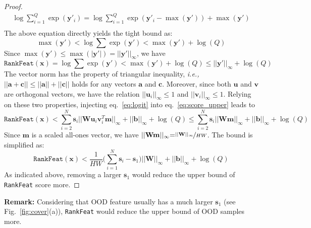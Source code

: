 \begin{proof}
\begin{equation}
\begin{gathered}
     \log \sum_{i=1}^{Q} \exp(\mathbf{y}'_{i}) =  \log \sum_{i=1}^{Q} \exp(\mathbf{y}'_{i}-\max(\mathbf{y}')) + \max(\mathbf{y}')\\
\end{gathered}
\end{equation}
The above equation directly yields the tight bound as:
\begin{equation}
    \max(\mathbf{y}')   < \log \sum \exp(\mathbf{y}') < \max(\mathbf{y}') + \log(Q)
\end{equation}
Since $\max(\mathbf{y}'){\leq}\max(|\mathbf{y}'|){=}||\mathbf{y}'||_{\infty}$, we have
\begin{equation}
    \texttt{RankFeat}(\mathbf{x}) = \log \sum \exp(\mathbf{y}') < \max(\mathbf{y}') + \log(Q) \leq  ||\mathbf{y}'||_{\infty} + \log(Q) 
    \label{eq:score_upper}
\end{equation}
The vector norm has the property of triangular inequality, \emph{i.e.,} $||\mathbf{a}+\mathbf{c}||\leq||\mathbf{a}||+||\mathbf{c}||$ holds for any vectors $\mathbf{a}$ and $\mathbf{c}$. Moreover, since both $\mathbf{u}$ and $\mathbf{v}$ are orthogonal vectors, we have the relation $||\mathbf{u}_{i}||_{\infty}{\leq}1$ and $||\mathbf{v}_{i}||_{\infty}{\leq}1$.
Relying on these two properties, injecting eq.~\eqref{eq:logit} into eq.~\eqref{eq:score_upper} leads to
\begin{equation}
    \texttt{RankFeat}(\mathbf{x}) {<} \sum_{i=2}^{N} \mathbf{s}_{i} ||\mathbf{W}\mathbf{u}_{i}\mathbf{v}_{i}^{T}\mathbf{m}||_{\infty} {+} ||\mathbf{b}||_{\infty} {+} \log(Q) {\leq} \sum_{i=2}^{N} \mathbf{s}_{i} ||\mathbf{W}\mathbf{m}||_{\infty} {+}  ||\mathbf{b}||_{\infty} {+} \log(Q)
\end{equation}
Since $\mathbf{m}$ is a scaled all-ones vector, we have $||\mathbf{W}\mathbf{m}||_{\infty}{=}\nicefrac{||\mathbf{W}||_{\infty}}{HW}$. The bound is simplified as:
\begin{equation}
    \texttt{RankFeat}(\mathbf{x}) <\frac{1}{HW} \Big(\sum_{i=1}^{N} \mathbf{s}_{i} - \mathbf{s}_{1}\Big) ||\mathbf{W}||_{\infty} +  ||\mathbf{b}||_{\infty} + \log(Q)
\end{equation}
As indicated above, removing a larger $\mathbf{s}_{1}$ would reduce the upper bound of \texttt{RankFeat} score more.
\end{proof}



\noindent\textbf{Remark:} Considering that OOD feature usually has a much larger $\mathbf{s}_{1}$ (see Fig.~\ref{fig:cover}(a)), \texttt{RankFeat} would reduce the upper bound of OOD samples more. 

